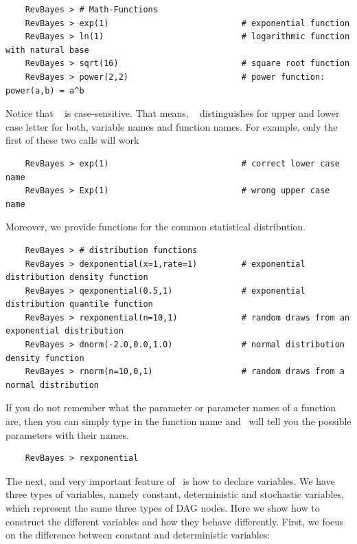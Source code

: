 \documentclass[11pt]{article}
\begin{document}
{\tt \begin{snugshade*}
\begin{lstlisting}    
    RevBayes > # Math-Functions
    RevBayes > exp(1)                           # exponential function
    RevBayes > ln(1)                            # logarithmic function with natural base
    RevBayes > sqrt(16)                         # square root function 
    RevBayes > power(2,2)                       # power function: power(a,b) = a^b
\end{lstlisting}
\end{snugshade*}}
Notice that \Rev~ is case-sensitive. That means, \Rev~ distinguishes for upper and lower case letter for both, variable names and function names. For example, only the first of these two calls will work
{\tt \begin{snugshade*}
\begin{lstlisting}    
    RevBayes > exp(1)                           # correct lower case name
    RevBayes > Exp(1)                           # wrong upper case name
\end{lstlisting}
\end{snugshade*}}
Moreover, we provide functions for the common statistical distribution.
{\tt \begin{snugshade*}
\begin{lstlisting}    
    RevBayes > # distribution functions
    RevBayes > dexponential(x=1,rate=1)         # exponential distribution density function
    RevBayes > qexponential(0.5,1)              # exponential distribution quantile function
    RevBayes > rexponential(n=10,1)             # random draws from an exponential distribution
    RevBayes > dnorm(-2.0,0.0,1.0)              # normal distribution density function
    RevBayes > rnorm(n=10,0,1)                  # random draws from a normal distribution
\end{lstlisting}
\end{snugshade*}}
If you do not remember what the parameter or parameter names of a function are, then you can simply type in the function name and \RevBayes~will tell you the possible parameters with their names.
{\tt \begin{snugshade*}
\begin{lstlisting}    
    RevBayes > rexponential
\end{lstlisting}
\end{snugshade*}}

The next, and very important feature of \RevBayes~is how to declare variables. 
We have three types of variables, namely constant, deterministic and stochastic variables, which represent the same three types of DAG nodes. 
Here we show how to construct the different variables and how they behave differently. 
First, we focus on the difference between constant and deterministic variables: 
\end{document}
